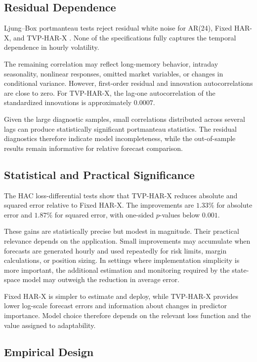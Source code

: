 \subsection{Residual Dependence}

Ljung--Box portmanteau tests reject residual white noise for
AR(24), Fixed HAR-X, and TVP-HAR-X
\citep{ljungbox1978}. None of the specifications fully captures
the temporal dependence in hourly volatility.

The remaining correlation may reflect long-memory behavior,
intraday seasonality, nonlinear responses, omitted market
variables, or changes in conditional variance. However,
first-order residual and innovation autocorrelations are close
to zero. For TVP-HAR-X, the lag-one autocorrelation of the
standardized innovations is approximately \(0.0007\).

Given the large diagnostic samples, small correlations
distributed across several lags can produce statistically
significant portmanteau statistics. The residual diagnostics
therefore indicate model incompleteness, while the
out-of-sample results remain informative for relative forecast
comparison.

\subsection{Statistical and Practical Significance}

The HAC loss-differential tests show that TVP-HAR-X reduces
absolute and squared error relative to Fixed HAR-X. The
improvements are \(1.33\%\) for absolute error and \(1.87\%\)
for squared error, with one-sided \(p\)-values below \(0.001\).

These gains are statistically precise but modest in magnitude.
Their practical relevance depends on the application. Small
improvements may accumulate when forecasts are generated
hourly and used repeatedly for risk limits, margin
calculations, or position sizing. In settings where
implementation simplicity is more important, the additional
estimation and monitoring required by the state-space model may
outweigh the reduction in average error.

Fixed HAR-X is simpler to estimate and deploy, while
TVP-HAR-X provides lower log-scale forecast errors and
information about changes in predictor importance. Model choice
therefore depends on the relevant loss function and the value
assigned to adaptability.

\subsection{Empirical Design}

